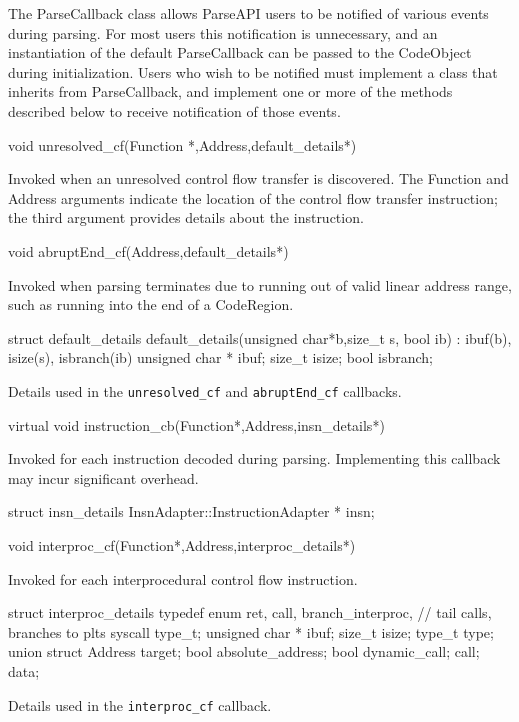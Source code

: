\documentclass{article}
\newenvironment{apient}{\small\verbatim}{\endverbatim}
\newcommand{\apidesc}[1]{%
{\addtolength{\leftskip}{4em}%
#1\par\medskip}
}
\begin{document}
The ParseCallback class allows ParseAPI users to be notified of various events
during parsing. For most users this notification is unnecessary, and an
instantiation of the default ParseCallback can be passed to the CodeObject during initialization. Users who wish to be notified must implement a class that inherits from ParseCallback, and implement one or more of the methods described below to receive notification of those events.

\begin{apient}
void unresolved_cf(Function *,Address,default_details*)
\end{apient}
\apidesc{Invoked when an unresolved control flow transfer is discovered. The Function and Address arguments indicate the location of the control flow transfer instruction; the third argument provides details about the instruction.}
\begin{apient}
void abruptEnd_cf(Address,default_details*) 
\end{apient}
\apidesc{Invoked when parsing terminates due to running out of valid linear address range, such as running into the end of a CodeRegion.}

\begin{apient}
struct default_details {
    default_details(unsigned char*b,size_t s, bool ib) : ibuf(b), isize(s), isbranch(ib) { }
    unsigned char * ibuf;
    size_t isize;
    bool isbranch;
}
\end{apient}
\apidesc{Details used in the \texttt{unresolved\_cf} and \texttt{abruptEnd\_cf}
callbacks.}


\begin{apient}
virtual void instruction_cb(Function*,Address,insn_details*)
\end{apient}
\apidesc{Invoked for each instruction decoded during parsing. Implementing this callback may incur significant overhead.}

\begin{apient}
struct insn_details {
    InsnAdapter::InstructionAdapter * insn;
}
\end{apient}

\begin{apient}
void interproc_cf(Function*,Address,interproc_details*)
\end{apient}
\apidesc{Invoked for each interprocedural control flow instruction.}

\begin{apient}  
struct interproc_details {
    typedef enum {
        ret,
        call,
        branch_interproc, // tail calls, branches to plts
        syscall
    } type_t;
    unsigned char * ibuf;
    size_t isize;
    type_t type;
    union {
        struct {
            Address target;
            bool absolute_address;
            bool dynamic_call;
        } call;
    } data;
}
\end{apient}
\apidesc{Details used in the \texttt{interproc\_cf} callback.}
\end{document}
